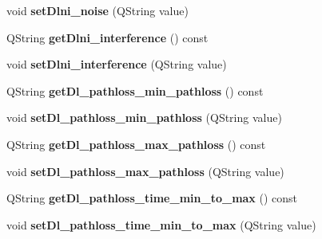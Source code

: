 \begin{DoxyCompactItemize}
\item 
void {\bfseries set\+Dlni\+\_\+noise} (Q\+String value)\hypertarget{class_channel_model_afbb90279c112f50d2106844c5fe4e1f2}{}\label{class_channel_model_afbb90279c112f50d2106844c5fe4e1f2}

\item 
Q\+String {\bfseries get\+Dlni\+\_\+interference} () const \hypertarget{class_channel_model_a24411bc470d92480ad7f15d602b8d774}{}\label{class_channel_model_a24411bc470d92480ad7f15d602b8d774}

\item 
void {\bfseries set\+Dlni\+\_\+interference} (Q\+String value)\hypertarget{class_channel_model_ab936e94283d3cea954af75cafed9675e}{}\label{class_channel_model_ab936e94283d3cea954af75cafed9675e}

\item 
Q\+String {\bfseries get\+Dl\+\_\+pathloss\+\_\+min\+\_\+pathloss} () const \hypertarget{class_channel_model_abff8a3ce81e716e213947eff3cdb6591}{}\label{class_channel_model_abff8a3ce81e716e213947eff3cdb6591}

\item 
void {\bfseries set\+Dl\+\_\+pathloss\+\_\+min\+\_\+pathloss} (Q\+String value)\hypertarget{class_channel_model_a6a41fa959fc8b756203ca95963b7e62a}{}\label{class_channel_model_a6a41fa959fc8b756203ca95963b7e62a}

\item 
Q\+String {\bfseries get\+Dl\+\_\+pathloss\+\_\+max\+\_\+pathloss} () const \hypertarget{class_channel_model_a90b5fc0b2a7859044ffa9bf4c514d846}{}\label{class_channel_model_a90b5fc0b2a7859044ffa9bf4c514d846}

\item 
void {\bfseries set\+Dl\+\_\+pathloss\+\_\+max\+\_\+pathloss} (Q\+String value)\hypertarget{class_channel_model_afdcd481539e0b560731cbe0c1c1bca77}{}\label{class_channel_model_afdcd481539e0b560731cbe0c1c1bca77}

\item 
Q\+String {\bfseries get\+Dl\+\_\+pathloss\+\_\+time\+\_\+min\+\_\+to\+\_\+max} () const \hypertarget{class_channel_model_ab62eb20bf53dca5089209f86b62ec297}{}\label{class_channel_model_ab62eb20bf53dca5089209f86b62ec297}

\item 
void {\bfseries set\+Dl\+\_\+pathloss\+\_\+time\+\_\+min\+\_\+to\+\_\+max} (Q\+String value)\hypertarget{class_channel_model_a9754be20530ae597841bd2e089105d5e}{}\label{class_channel_model_a9754be20530ae597841bd2e089105d5e}


\end{DoxyCompactItemize}
